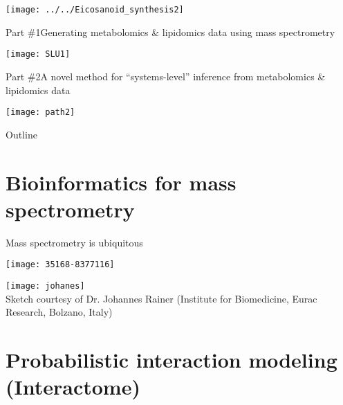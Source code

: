 \documentclass[xcolor=dvipsnames]{beamer}
\begin{document}
\begin{frame}
\begin{center}
	\texttt{[image: ../../Eicosanoid\_synthesis2]}
\end{center}
\end{frame}

\begin{frame}{Part \#1}{Generating metabolomics \& lipidomics data using mass spectrometry}
\vspace{-15pt}
\begin{center}
	\texttt{[image: SLU1]}
\end{center}
\end{frame}

\begin{frame}{Part \#2}{A novel method for ``systems-level'' inference from metabolomics \& lipidomics data}
	\vspace{-15pt}
	\begin{center}
		\texttt{[image: path2]}
	\end{center}
\end{frame}

\begin{frame}{Outline}
	\vspace{-10.5pt}
	\tableofcontents[hideallsubsections]
\end{frame}

\section{Bioinformatics for mass spectrometry}

\begin{frame}{Mass spectrometry is ubiquitous}
	\vspace{-15pt}
\begin{center}
	\texttt{[image: 35168-8377116]}
\end{center}
\end{frame}

\begin{frame}{}
	\texttt{[image: johanes]}\\
	Sketch courtesy of Dr. Johannes Rainer (Institute for Biomedicine, Eurac
	Research, Bolzano, Italy)
\end{frame}

\section{Probabilistic interaction modeling (Interactome)}
\end{document}
